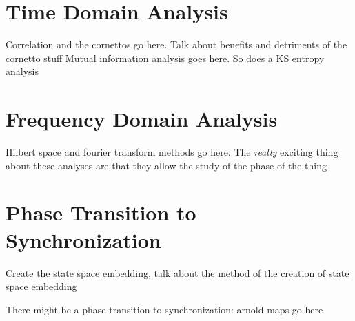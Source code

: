 \documentclass[12pt]{article}
\begin{document}

\section{Time Domain Analysis}
Correlation and the cornettos go here. Talk about benefits and detriments of the cornetto stuff
Mutual information analysis goes here. So does a KS entropy analysis

\section{Frequency Domain Analysis}
Hilbert space and fourier transform methods go here. The \emph{really} exciting thing about these analyses are that they allow the study of the phase of the thing

\section{Phase Transition to Synchronization}

Create the state space embedding, talk about the method of the creation of state space embedding

There might be a phase transition to synchronization: arnold maps go here

%
%
%
%
%
%
%
\end{document}
